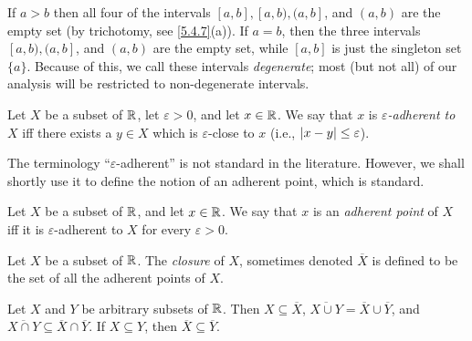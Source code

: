 \begin{eg}\label{9.1.4}
  If \(a > b\) then all four of the intervals \([a, b], [a, b), (a, b]\), and \((a, b)\) are the empty set (by trichotomy, see \cref{5.4.7}(a)).
  If \(a = b\), then the three intervals \([a, b), (a, b]\), and \((a, b)\) are the empty set, while \([a, b]\) is just the singleton set \(\{a\}\).
  Because of this, we call these intervals \emph{degenerate};
  most (but not all) of our analysis will be restricted to non-degenerate intervals.
\end{eg}

\begin{defn}\label{9.1.5}
  Let \(X\) be a subset of \(\mathbb{R}\), let \(\varepsilon > 0\), and let \(x \in \mathbb{R}\).
  We say that \(x\) is \emph{\(\varepsilon\)-adherent to \(X\)} iff there exists a \(y \in X\) which is \(\varepsilon\)-close to \(x\)
  (i.e., \(\left\lvert x - y\right\rvert \leq \varepsilon\)).
\end{defn}

\begin{rmk}\label{9.1.6}
  The terminology ``\(\varepsilon\)-adherent'' is not standard in the literature.
  However, we shall shortly use it to define the notion of an adherent point, which is standard.
\end{rmk}

\setcounter{thm}{7}
\begin{defn}\label{9.1.8}
  Let \(X\) be a subset of \(\mathbb{R}\), and let \(x \in \mathbb{R}\).
  We say that \(x\) is an \emph{adherent point} of \(X\) iff it is \(\varepsilon\)-adherent to \(X\) for every \(\varepsilon > 0\).
\end{defn}

\setcounter{thm}{9}
\begin{defn}[Closure]\label{9.1.10}
  Let \(X\) be a subset of \(\mathbb{R}\).
  The \emph{closure} of \(X\), sometimes denoted \(\overline{X}\) is defined to be the set of all the adherent points of \(X\).
\end{defn}

\begin{lem}\label{9.1.11}
  Let \(X\) and \(Y\) be arbitrary subsets of \(\mathbb{R}\).
  Then \(X \subseteq \overline{X}\), \(\overline{X \cup Y} = \overline{X} \cup \overline{Y}\), and \(\overline{X \cap Y} \subseteq \overline{X} \cap \overline{Y}\).
  If \(X \subseteq Y\), then \(\overline{X} \subseteq \overline{Y}\).
\end{lem}

